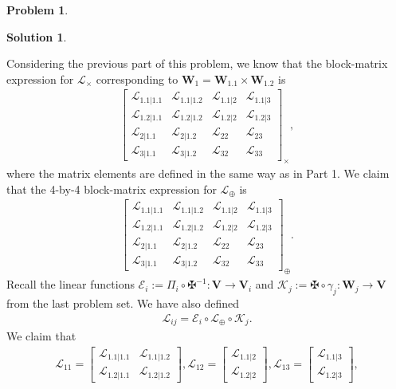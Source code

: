\documentclass{book}
\theoremstyle{definition}
\newtheorem*{prob*}{Problem}
\newtheorem*{sln*}{Solution}
\newcommand{\V}{\mathbf{V}}
\newcommand{\W}{\mathbf{W}}
\newcommand{\lag}{\mathcal{L}}
\newcommand{\K}{\mathcal{K}}
\newcommand{\E}{\mathcal{E}}
\begin{document}
\begin{prob*}
\begin{sln*}
\begin{enumerate}
		
		Considering the previous part of this problem, we know that the block-matrix expression for $\lag_{\times}$ corresponding to $\W_{1} = \W_{1.1}\times \W_{1.2}$ is
		\begin{align*}
		\begin{bmatrix}
		\lag_{1.1|1.1} & \lag_{1.1|1.2} & \lag_{1.1|2} & \lag_{1.1|3}\\
		\lag_{1.2|1.1} & \lag_{1.2|1.2} & \lag_{1.2|2} & \lag_{1.2|3}\\
		\lag_{2|1.1} & \lag_{2|1.2} & \lag_{22} & \lag_{23}\\
		\lag_{3|1.1} & \lag_{3|1.2} & \lag_{32} & \lag_{33}
		\end{bmatrix}_\times,
		\end{align*}
		where the matrix elements are defined in the same way as in Part 1. We claim that the 4-by-4 block-matrix expression for $\lag_{\oplus}$ is
		\begin{align*}
		\begin{bmatrix}
		\lag_{1.1|1.1} & \lag_{1.1|1.2} & \lag_{1.1|2} & \lag_{1.1|3}\\
		\lag_{1.2|1.1} & \lag_{1.2|1.2} & \lag_{1.2|2} & \lag_{1.2|3}\\
		\lag_{2|1.1} & \lag_{2|1.2} & \lag_{22} & \lag_{23}\\
		\lag_{3|1.1} & \lag_{3|1.2} & \lag_{32} & \lag_{33}
		\end{bmatrix}_\oplus.
		\end{align*}
		Recall the linear functions $\E_i := \Pi_i \circ \maltese^{-1} : \V \to \V_i$ and $\K_j := \maltese\circ \gamma_j : \W_j \to \V$ from the last problem set. We have also defined
		\begin{align*}
		\lag_{ij} = \E_i \circ \lag_\oplus \circ \K_j.
		\end{align*}	
		We claim that 
		\begin{align*}
		\lag_{11} = \begin{bmatrix}
		\lag_{1.1|1.1} & \lag_{1.1|1.2}\\
		\lag_{1.2|1.1} & \lag_{1.2|1.2}
		\end{bmatrix}, \lag_{12} = \begin{bmatrix}
		\lag_{1.1|2}\\ \lag_{1.2|2}
		\end{bmatrix}, \lag_{13} = \begin{bmatrix}
		\lag_{1.1|3}\\\lag_{1.2|3}
		\end{bmatrix},
		\end{align*}
		\begin{align*}

\end{align*}
\end{enumerate}
\end{sln*}
\end{prob*}
\end{document}

